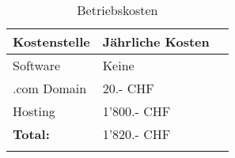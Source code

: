 \begin{longtable}[]{@{}lll@{}}
  \toprule
  \textbf{Kostenstelle} & \textbf{Jährliche Kosten}\tabularnewline
  \midrule
  \endhead
  Software              & Keine\tabularnewline
  .com Domain           & 20.- CHF\tabularnewline
  Hosting               & 1'800.- CHF\tabularnewline
  \midrule
  \textbf{Total:}       & 1'820.- CHF\tabularnewline
  \bottomrule
  \caption{Betriebskosten}
\end{longtable}
